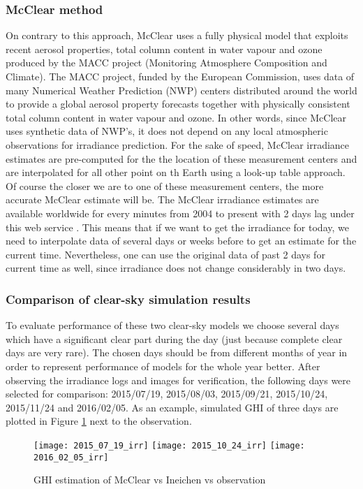 \subsubsection{McClear method}
On contrary to this approach, McClear uses a fully physical model that exploits recent aerosol properties, total column content in water vapour and ozone produced by the MACC project (Monitoring Atmosphere Composition and Climate). The MACC project, funded by the European Commission, uses  data of many Numerical Weather Prediction (NWP) centers distributed around the world to provide a global aerosol property forecasts together with physically consistent total column content in water vapour and ozone. In other words, since McClear uses synthetic data of NWP's, it does not depend on any local atmospheric observations for irradiance prediction. For the sake of speed, McClear irradiance estimates are pre-computed for the the location of these measurement centers and are interpolated for all other point on th Earth using a look-up table approach. Of course the closer we are to one of these measurement centers, the more accurate McClear estimate will be. The McClear irradiance estimates are available worldwide for every minutes from 2004 to present with 2 days lag under this web service \cite{mcclear_site}. This means that if we want to get the irradiance for today, we need to interpolate data of several days or weeks before to get an estimate for the current time. Nevertheless, one can use the original data of past 2 days for current time as well, since irradiance does not change considerably in two days.

\subsubsection{Comparison of clear-sky simulation results}
\label{sec:compare-clear-sky-result}
To evaluate performance of these two clear-sky models we choose several days which have a significant clear part during the day (just because complete clear days are very rare). The chosen days should be from different months of year in order to represent performance of models for the whole year better. After observing the irradiance logs and images for verification, the following days were selected for comparison: 2015/07/19, 2015/08/03, 2015/09/21, 2015/10/24, 2015/11/24 and 2016/02/05. As an example, simulated GHI of three days are plotted in Figure \ref{fig:mcclear_vs_Ineichen_days} next to the observation. 

\begin{figure}[h]
\caption{GHI estimation of McClear vs Ineichen vs observation}
\label{fig:mcclear_vs_Ineichen_days}
\texttt{[image: 2015\_07\_19\_irr]}
\texttt{[image: 2015\_10\_24\_irr]}
\texttt{[image: 2016\_02\_05\_irr]}
\centering
\end{figure}

